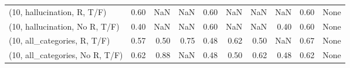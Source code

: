 \begin{table*}[h!]
\begin{adjustbox}{width=2\columnwidth,center}
\begin{tabular}{lrrr|rrr|rrr}
(10, hallucination, R, T/F)           &                      0.60 &                   NaN &                       NaN &                          0.60 &                       NaN &                           NaN &                                    NaN &                               0.60 &                                  None \\
(10, hallucination, No R, T/F)        &                      0.40 &                   NaN &                       NaN &                          0.60 &                       NaN &                           NaN &                                   0.40 &                               0.60 &                                  None \\
(10, all\_categories, R, T/F)          &                      0.57 &                  0.50 &                      0.75 &                          0.48 &                      0.62 &                          0.50 &                                    NaN &                               0.67 &                                  None \\
(10, all\_categories, No R, T/F)       &                      0.62 &                  0.88 &                       NaN &                          0.48 &                      0.50 &                          0.62 &                                   0.48 &                               0.62 &                                  None \\




\end{tabular}
\end{adjustbox}
\end{table*}
